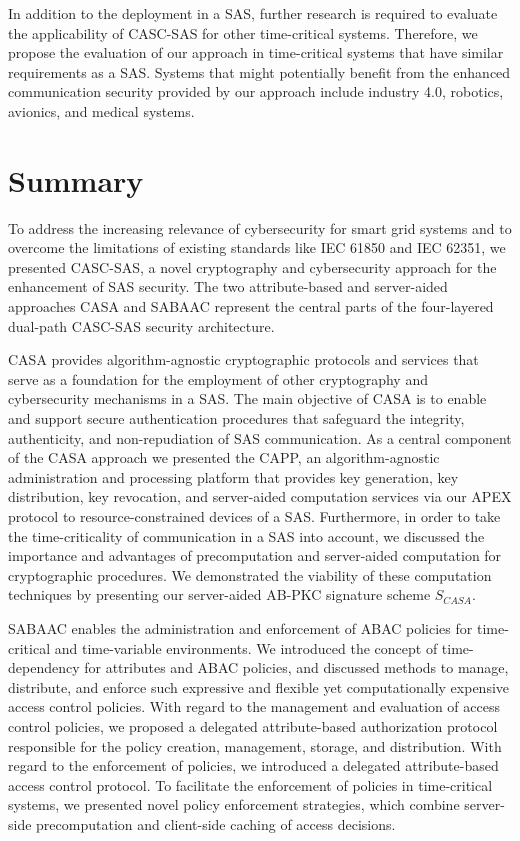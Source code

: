 In addition to the deployment in a SAS, further research is required to evaluate the applicability of CASC-SAS for other time-critical systems.
Therefore, we propose the evaluation of our approach in time-critical systems that have similar requirements as a SAS.
Systems that might potentially benefit from the enhanced communication security provided by our approach include industry 4.0, robotics, avionics, and medical systems.

\section{Summary}
\label{sec:conclusion:summary}
To address the increasing relevance of cybersecurity for smart grid systems and to overcome the limitations of existing standards like IEC 61850 and IEC 62351, we presented CASC-SAS, a novel cryptography and cybersecurity approach for the enhancement of SAS security.
The two attribute-based and server-aided approaches CASA and SABAAC represent the central parts of the four-layered dual-path CASC-SAS security architecture.

CASA provides algorithm-agnostic cryptographic protocols and services that serve as a foundation for the employment of other cryptography and cybersecurity mechanisms in a SAS.
The main objective of CASA is to enable and support secure authentication procedures that safeguard the integrity, authenticity, and non-repudiation of SAS communication.
As a central component of the CASA approach we presented the CAPP, an algorithm-agnostic administration and processing platform that provides key generation, key distribution, key revocation, and server-aided computation services via our APEX protocol to resource-constrained devices of a SAS.
Furthermore, in order to take the time-criticality of communication in a SAS into account, we discussed the importance and advantages of precomputation and server-aided computation for cryptographic procedures.
We demonstrated the viability of these computation techniques by presenting our server-aided AB-PKC signature scheme $S_{CASA}$.

SABAAC enables the administration and enforcement of ABAC policies for time-critical and time-variable environments.
We introduced the concept of time-dependency for attributes and ABAC policies, and discussed methods to manage, distribute, and enforce such expressive and flexible yet computationally expensive access control policies.
With regard to the management and evaluation of access control policies, we proposed a delegated attribute-based authorization protocol responsible for the policy creation, management, storage, and distribution.
With regard to the enforcement of policies, we introduced a delegated attribute-based access control protocol.
To facilitate the enforcement of policies in time-critical systems, we presented novel policy enforcement strategies, which combine server-side precomputation and client-side caching of access decisions.

